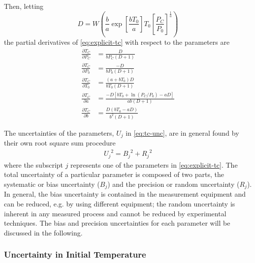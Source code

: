 \documentclass[../main.tex]{subfiles}
\begin{document}
Then, letting
%
\begin{equation*}
D = W\!\left(\frac{b}{a} \exp\!{\left[\frac{b T_0}{a}\right]} T_0 \left[\frac{P_C}{P_0}\right]^{\frac{1}{a}}\right)
\end{equation*}
%
the partial derivatives of \autoref{eq:explicit-tc} with respect to the parameters are
%
\begin{subequations}
\begin{align}
\frac{\partial T_C}{\partial P_C} &= \frac{D}{b P_C \left(D + 1\right)} \\
\frac{\partial T_C}{\partial P_0} &= \frac{-D}{b P_0 \left(D + 1\right)} \\
\frac{\partial T_C}{\partial T_0} &= \frac{\left(a + b T_0\right) D}{b T_0 \left(D + 1\right)} \\
\frac{\partial T_C}{\partial a} &= \frac{-D \left[b T_0 + \ln{\left(P_C/P_0\right)} - a D\right]}{a b \left(D + 1\right)} \\
\frac{\partial T_C}{\partial b} &= \frac{D\left(b T_0 - a D\right)}{{b}^2\left(D + 1\right)}
\end{align}
\end{subequations}

The uncertainties of the parameters, $U_j$ in \autoref{eq:tc-unc}, are in
general found by their own root square sum procedure
%
\begin{align}
{U_j}^2 = {B_j}^2 + {R_j}^2
\end{align}
%
where the subscript $j$ represents one of the parameters in \autoref{eq:explicit-tc}.
The total uncertainty of a particular parameter is composed of
two parts, the systematic or bias uncertainty ($B_j$) and the
precision or random uncertainty ($R_j$). In general, the bias
uncertainty is contained in the measurement equipment and can
be reduced, e.g. by using different equipment; the random uncertainty
is inherent in any measured process and cannot be reduced by
experimental techniques. The bias and precision uncertainties
for each parameter will be discussed in the following.

\subsubsection{Uncertainty in Initial Temperature}
\end{document}
